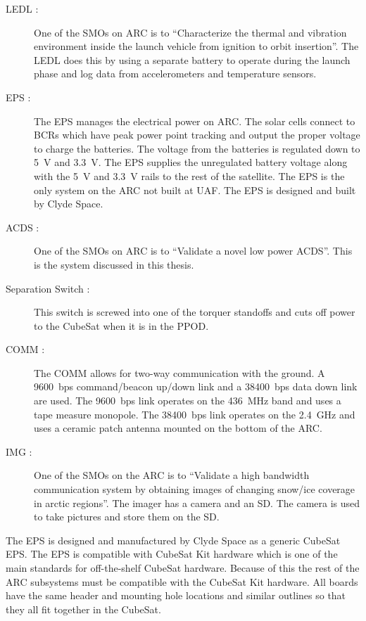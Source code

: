 \begin{description}
    \item[\acs{LEDL} :] One of the \acp{SMO} on \ac{ARC} is to \enquote{Characterize the thermal and vibration environment inside the launch vehicle from ignition to orbit insertion}\cite{ARCweb}. The \ac{LEDL} does this by using a separate battery to operate during the launch phase and log data from accelerometers and temperature sensors.
    \item[\acs{EPS} :] The \ac{EPS} manages the electrical power on \ac{ARC}. The solar cells connect to \acp{BCR} which have peak power point tracking and output the proper voltage to charge the batteries. The voltage from the batteries is regulated down to 5~V and 3.3~V. The \ac{EPS} supplies the unregulated battery voltage along with the 5~V and 3.3~V rails to the rest of the satellite. The \ac{EPS} is the only system on the \ac{ARC} not built at UAF. The \ac{EPS} is designed and built by Clyde Space\cite{ClydeEPS}.
    \item[\acs{ACDS} :] One of the \acp{SMO} on \ac{ARC} is to \enquote{Validate a novel low power \acf{ACDS}}\cite{ARCweb}. This is the system discussed in this thesis.
    \item[Separation Switch :] This switch is screwed into one of the torquer standoffs and cuts off power to the CubeSat when it is in the \ac{PPOD}.
    \item[\acs{COMM} :] The \ac{COMM} allows for two-way communication with the ground. A 9600~bps command/beacon up/down link and a 38400~bps data down link are used. The 9600~bps link operates on the 436~MHz band and uses a tape measure monopole. The 38400~bps link operates on the 2.4~GHz and uses a ceramic patch antenna mounted on the bottom of the \ac{ARC}.
    \item[\acs{IMG} :] One of the \acp{SMO} on the \ac{ARC} is to \enquote{Validate a high bandwidth communication system by obtaining images of changing snow/ice coverage in arctic regions}\cite{ARCweb}. The imager has a camera and an \ac{SD}. The camera is used to take pictures and store them on the \ac{SD}.
\end{description}

The \ac{EPS} is designed and manufactured by Clyde Space as a generic CubeSat \ac{EPS}. The \ac{EPS} is compatible with CubeSat Kit\cite{CSK} hardware which is one of the main standards for off-the-shelf CubeSat hardware. Because of this the rest of the \ac{ARC} subsystems must be compatible with the CubeSat Kit hardware. All boards have the same header and mounting hole locations and similar outlines so that they all fit together in the CubeSat.

